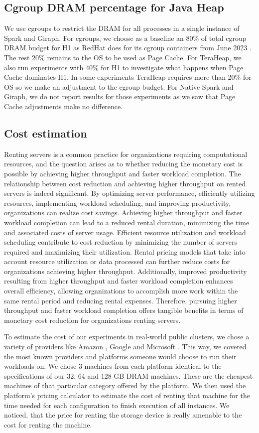 \subsection{Cgroup DRAM percentage for Java Heap}
We use cgroups \cite{cgroups} to restrict the DRAM for all processes in a single instance of Spark and Giraph.
For cgroups, we choose as a baseline an 80\% of total cgroup DRAM budget for H1 as RedHat does for its cgroup containers from June 2023 \cite{redhatblog}.
The rest 20\% remains to the OS to be used as Page Cache.
For TeraHeap, we also run experiments with 40\% for H1 to investigate what happens when Page Cache dominates H1.
In some experiments TeraHeap requires more than 20\% for OS so we make an adjustment to the cgroup budget.
For Native Spark and Giraph, we do not report results for those experiments as we saw that Page Cache adjustments make no difference.

\subsection{Cost estimation}
Renting servers is a common practice for organizations requiring
computational resources, and the question arises as to whether
reducing the monetary cost is possible by achieving higher throughput
and faster workload completion. The relationship between cost
reduction and achieving higher throughput on rented servers is indeed
significant. By optimizing server performance, efficiently utilizing
resources, implementing workload scheduling, and improving
productivity, organizations can realize cost savings. Achieving higher
throughput and faster workload completion can lead to a reduced rental
duration, minimizing the time and associated costs of server usage.
Efficient resource utilization and workload scheduling contribute to
cost reduction by minimizing the number of servers required and
maximizing their utilization. Rental pricing models that take into
account resource utilization or data processed can further reduce
costs for organizations achieving higher throughput. Additionally,
improved productivity resulting from higher throughput and faster
workload completion enhances overall efficiency, allowing
organizations to accomplish more work within the same rental period
and reducing rental expenses. Therefore, pursuing higher throughput
and faster workload completion offers tangible benefits in terms of
monetary cost reduction for organizations renting servers. 

To estimate the cost of our experiments in real-world public clusters, we
chose a variety of providers like Amazon \cite{EC2}, Google \cite{GCP} and Microsoft \cite{Azure}. This
way, we covered the most known providers and platforms someone would
choose to run their workloads on. We chose 3 machines from each
platform identical to the specifications of our 32, 64 and 128 GB DRAM
machines. These are the cheapest machines of that particular category
offered by the platform. We then used the platform's pricing
calculator to estimate the cost of renting that machine for the time
needed for each configuration to finish execution of all instances. We noticed, that the price for
renting the storage device is really amenable to the cost for renting the machine.
